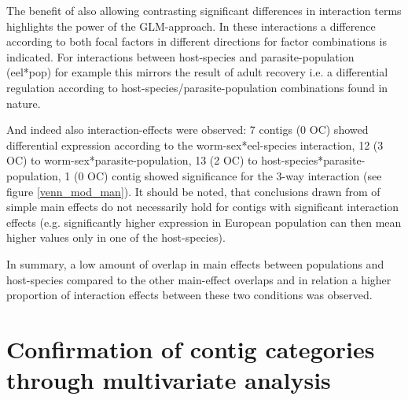 The benefit of also allowing contrasting significant differences in
interaction terms highlights the power of the GLM-approach. In these
interactions a difference according to both focal factors in different
directions for factor combinations is indicated. For interactions
between host-species and parasite-population (eel*pop) for example
this mirrors the result of adult recovery i.e. a differential
regulation according to host-species/parasite-population combinations
found in nature.

And indeed also interaction-effects were observed: 7 contigs (0 OC)
showed differential expression according to the worm-sex*eel-species
interaction, 12 (3 OC) to worm-sex*parasite-population, 13 (2 OC) to
host-species*parasite-population, 1 (0 OC) contig showed significance
for the 3-way interaction (see figure \ref{venn_mod_man}). It should
be noted, that conclusions drawn from of simple main effects do not
necessarily hold for contigs with significant interaction effects
(e.g. significantly higher expression in European population can then
mean higher values only in one of the host-species).


\afterpage{\clearpage}

In summary, a low amount of overlap in main effects between
populations and host-species compared to the other main-effect
overlaps and in relation a higher proportion of interaction effects
between these two conditions was observed.

\section{Confirmation of contig categories through multivariate
  analysis}

